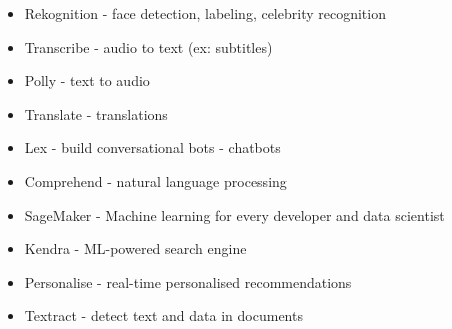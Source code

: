 \begin{itemize}
    \item Rekognition - face detection, labeling, celebrity recognition
    \item Transcribe - audio to text (ex: subtitles)
    \item Polly - text to audio
    \item Translate - translations
    \item Lex - build conversational bots - chatbots
    \item Comprehend - natural language processing
    \item SageMaker - Machine learning for every developer and data scientist
    \item Kendra - ML-powered search engine
    \item Personalise - real-time personalised recommendations
    \item Textract - detect text and data in documents
\end{itemize}